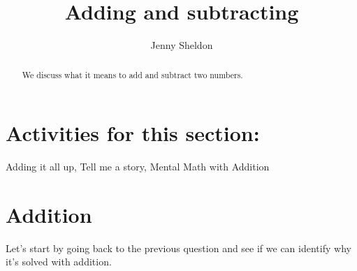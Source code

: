 \documentclass{ximera}
\title{Adding and subtracting}
\author{Jenny Sheldon}
\begin{document}
\begin{abstract}
We discuss what it means to add and subtract two numbers.
\end{abstract}
\maketitle

\section{Activities for this section:} Adding it all up, Tell me a story, Mental Math with Addition


\section{Addition}

Let's start by going back to the previous question and see if we can identify why it's solved with addition.
\end{document}
